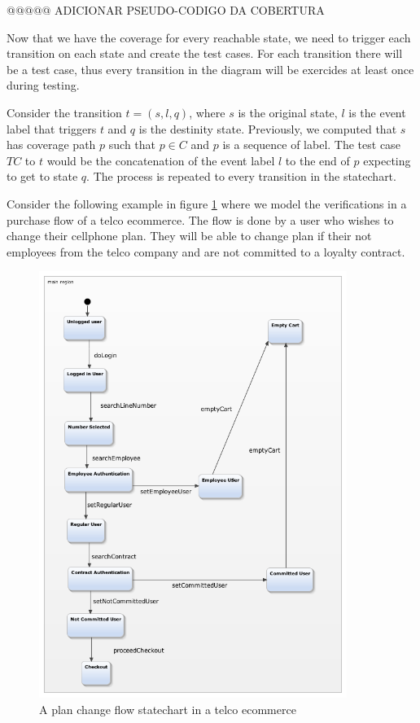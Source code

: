 @@@@@ ADICIONAR PSEUDO-CODIGO DA COBERTURA

Now that we have the coverage for every reachable state, we need to trigger each transition on each state and create the test cases. For each transition there will be a test case, thus every transition in the diagram will be exercides at least once during testing.

Consider the transition $t = (s,l,q)$, where $s$ is the original state, $l$ is the event label that triggers $t$ and $q$ is the destinity state. Previously, we computed that $s$ has coverage path $p$ such that $p \in C$ and $p$ is a sequence of label. The test case $TC$ to $t$ would be the concatenation of the event label $l$ to the end of $p$ expecting to get to state $q$. The process is repeated to every transition in the statechart.

Consider the following example in figure \ref{fig:trocaPlano} where we model the verifications in a purchase flow of a telco ecommerce. The flow is done by a user who wishes to change their cellphone plan. They will be able to change plan if their not employees from the telco company and are not committed to a loyalty contract.

\begin{figure}[htb]
\centering
\includegraphics[width=10cm]{figuras/trocaPlano}
\caption{\label{fig:trocaPlano} A plan change flow statechart in a telco ecommerce}
\end{figure}

